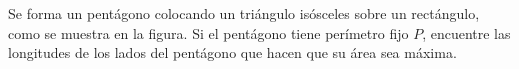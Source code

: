 \item Se forma un pentágono colocando un triángulo isósceles sobre un rectángulo, como se muestra en la figura. Si el pentágono tiene perímetro fijo $P$, encuentre las longitudes de los lados del pentágono que hacen que su área sea máxima.
